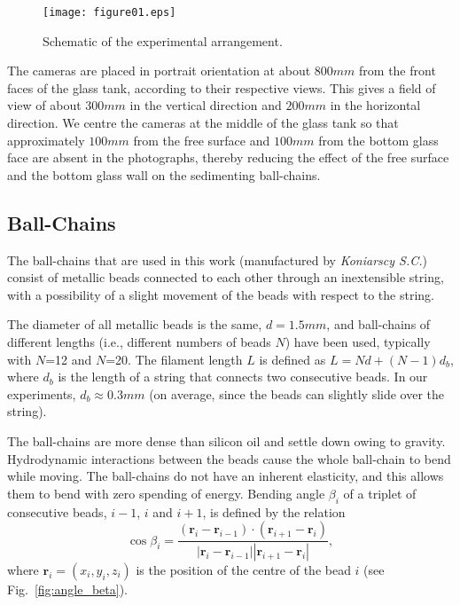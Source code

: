 \documentclass{article}
\begin{document}
\begin{figure}%
 \centering
 \texttt{[image: figure01.eps]}
 \caption{Schematic of %
 the experimental arrangement.}
 \label{fig:figure1}
\end{figure}

The cameras are placed in portrait orientation at about $800 mm$ from the front faces of the glass tank, %
according to their respective views. This gives a field of view of about $300 mm$ in the vertical direction and $200 mm$ in the horizontal direction. We centre the cameras at the middle of the glass tank so that approximately $100 mm$ from the free surface and $100 mm$ from the bottom glass face are absent in the photographs, thereby reducing the effect of the free surface and the bottom glass wall on the sedimenting ball-chains.

\subsection{Ball-Chains} \label{Ball_chains}
The ball-chains that are used in this work (manufactured by \textit{Koniarscy S.C.}) %
consist of metallic beads connected to each other through an inextensible string, 
with a possibility of a slight movement of the beads with respect to the string.

The diameter of all metallic beads is the same, $d = 1.5 mm$, and ball-chains of different lengths (i.e., different numbers of beads $N$) have been used, typically with $N$=12 and $N$=20. The filament length $L$ is defined as  
$L = Nd + (N-1)d_b$, where $d_b$ is the length of a string that connects two consecutive beads. In our experiments, 
$d_b \approx 0.3 mm$ 
(on average, since the beads can slightly slide over the string).

The ball-chains are more dense than silicon oil and settle down owing to gravity. Hydrodynamic interactions between the beads cause the whole ball-chain to bend while moving. The ball-chains do not have an inherent elasticity, and this allows them to bend with zero spending of energy. Bending angle $\beta_i$ of a triplet of consecutive beads, $i-1$, $i$ and $i+1$, is defined by the relation
\begin{equation}
\label{eq:beta}
    \cos \beta_i=\frac{(\bm{r}_i-\bm{r}_{i-1})\cdot (\bm{r}_{i+1}-\bm{r}_i)}{|\bm{r}_i-\bm{r}_{i-1}| |\bm{r}_{i+1}-\bm{r}_i|},
\end{equation}
where $\bm{r}_i=(x_i,y_i,z_i)$ is the position of the centre of the bead $i$ (see Fig.~\ref{fig:angle_beta}).
\end{document}

